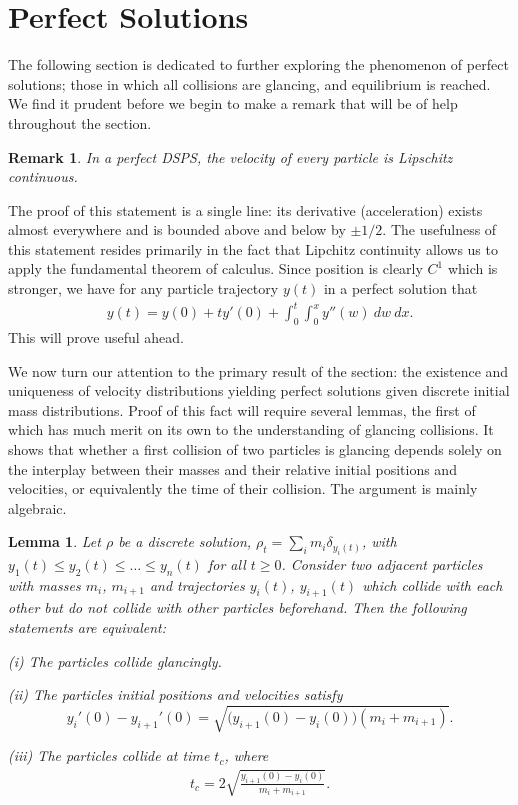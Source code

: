 \documentclass[11pt]{article}
\newtheorem{lemma}[theorem]{Lemma}
\newtheorem{remark}[theorem]{Remark}
\numberwithin{equation}{section}
\begin{document}
\section{Perfect Solutions}\label{perfect-section}
        The following section is dedicated to further exploring the phenomenon of perfect solutions; those in which all collisions are glancing, and equilibrium is reached. We find it prudent before we begin to make a remark that will be of help throughout the section.
        \begin{remark}\label{lipschitz}
            In a perfect DSPS, the velocity of every particle is Lipschitz continuous. 
        \end{remark}
        The proof of this statement is a single line: its derivative (acceleration) exists almost everywhere and is bounded above and below by $\pm 1/2$. The usefulness of this statement resides primarily in the fact that Lipchitz continuity allows us to apply the fundamental theorem of calculus. Since position is clearly $C^1$ which is stronger, we have for any particle trajectory $y(t)$ in a perfect solution that
        \begin{align}\label{position_double_integral}
            y(t) = y(0) + ty'(0) + \int^t_0 \!\! \int^x_0y''(w) \ dw \ dx.
        \end{align}
        This will prove useful ahead. 

        We now turn our attention to the primary result of the section: the existence and uniqueness of velocity distributions yielding perfect solutions given discrete initial mass distributions. Proof of this fact will require several lemmas, the first of which has much merit on its own to the understanding of glancing collisions. It shows that whether a first collision of two particles is glancing depends solely on the interplay between their masses and their relative initial positions and velocities, or equivalently the time of their collision. The argument is mainly algebraic. 
        \begin{lemma}\label{perfect-adjacent-particles}
            Let $\rho$ be a discrete solution, $\rho_t=\sum_i m_i\delta_{y_i(t)}$, with $y_1(t)\leq y_2(t)\leq\ldots\leq y_n(t)$ for all $t\geq0$. Consider two adjacent particles with masses $m_i$, $m_{i+1}$ and trajectories $y_i(t)$, $y_{i+1}(t)$ which collide with each other but do not collide with other particles beforehand. Then the following statements are equivalent:
           
            (i) The particles collide glancingly.

            (ii) The particles initial positions and velocities satisfy
            \begin{equation}\label{veloc-perfect}
                y_i'(0)-y_{i+1}'(0)=\sqrt{\big(y_{i+1}(0)-y_i(0)\big)(m_i+m_{i+1})}.
            \end{equation}

            (iii) The particles collide at time $t_c$, where 
            \begin{align}\label{TC}
                t_c=2\sqrt{\frac{y_{i+1}(0)-y_i(0)}{m_i+m_{i+1}}}.
            \end{align}
        \end{lemma}
    
\end{document}
